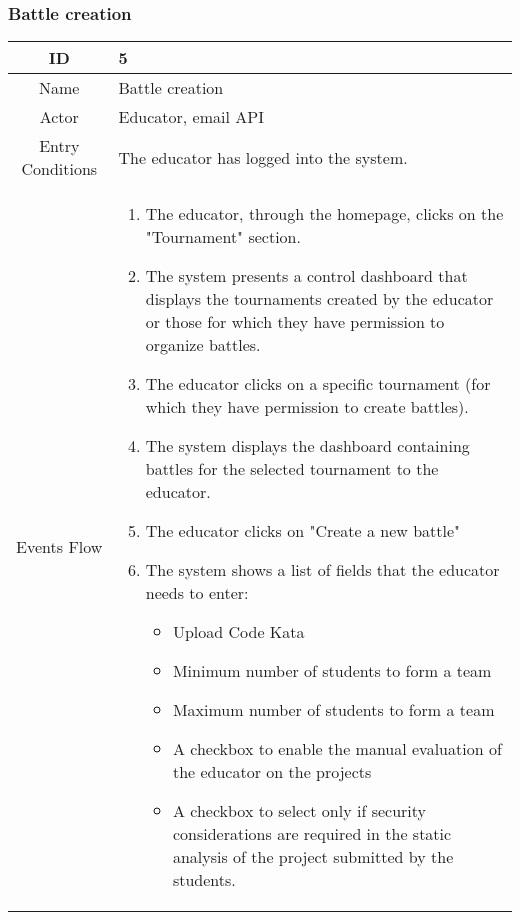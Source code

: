 \subsubsection{Battle creation}

\begin{longtable}{|c| p{10cm}|}
    \hline
        ID & 5 \\
    \hline
        Name & Battle creation \\
    \hline
        Actor & Educator, email API \\
    \hline
        Entry Conditions & 
            
            The educator has logged into the system.
            \\
    \hline
        Events Flow &   \begin{enumerate}
                            \item The educator, through the homepage, clicks on the "Tournament" section.
                            \item The system presents a control dashboard that displays the tournaments created by the educator or those for which they have permission to organize battles.
                            \item The educator clicks on a specific tournament (for which they have permission to create battles).
                            \item The system displays the dashboard containing battles for the selected tournament to the educator.
                            \item The educator clicks on "Create a new battle"
                            \item The system shows a list of fields that the educator needs to enter:
                            \begin{itemize}
                                \item Upload Code Kata
                                \item Minimum number of students to form a team
                                \item Maximum number of students to form a team
                                \item A checkbox to enable the manual evaluation of the educator on the projects
                                \item A checkbox to select only if security considerations are required in the static analysis of the project submitted by the students.

\end{itemize}
\end{enumerate}
\end{longtable}
